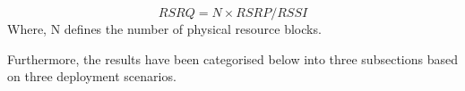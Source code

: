 \documentclass[conference,a4paper,xcolor=table]{IEEEtran}
\begin{document}
\[ RSRQ= {{N\times} RSRP/ RSSI}\]
Where, N defines the number of physical resource blocks.
\begin{table}[h]
\centering
{}
\caption {RSRQ reference values for NB-IoT as per 3GPP standards\cite{3GPP,sikora2019performance}}
\label{nbiotRSRQ}
\end{table}

Furthermore, the results have been categorised below into three subsections based on three deployment scenarios.
\end{document}
